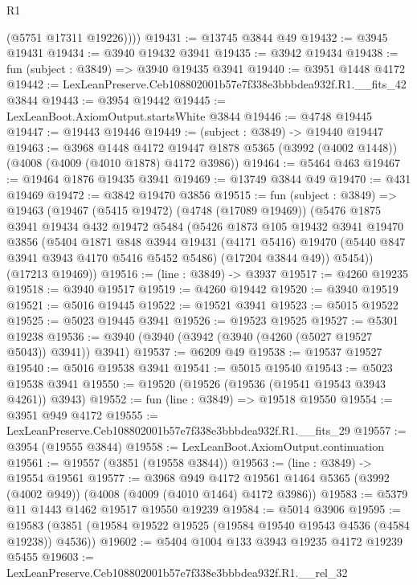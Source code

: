 \begin{lexlean}{R1}
\begin{coremodule}
          (@5751 @17311 @19226))))
@19431 := @13745 @3844 @49
@19432 := @3945 @19431
@19434 := @3940 @19432 @3941
@19435 := @3942 @19434
@19438 := fun (subject : @3849) => @3940 @19435 @3941
@19440 := @3951 @1448 @4172
@19442 := LexLeanPreserve.Ceb108802001b57e7f338e3bbbdea932f.R1.__fits_42 @3844
@19443 := @3954 @19442
@19445 := LexLeanBoot.AxiomOutput.startsWhite @3844
@19446 := @4748 @19445
@19447 := @19443 @19446
@19449 := (subject : @3849) -> @19440 @19447
@19463 := @3968
    @1448
    @4172
    @19447
    @1878
    @5365
    (@3992 (@4002 @1448))
    (@4008 (@4009 (@4010 @1878) @4172 @3986))
@19464 := @5464 @463
@19467 := @19464 @1876 @19435 @3941
@19469 := @13749 @3844 @49
@19470 := @431 @19469
@19472 := @3842 @19470 @3856
@19515 := fun (subject : @3849) =>
  @19463
    (@19467
      (@5415 @19472)
      (@4748 (@17089 @19469))
      (@5476
        @1875
        @3941
        @19434
        @432
        @19472
        @5484
        (@5426
          @1873
          @105
          @19432
          @3941
          @19470
          @3856
          (@5404
            @1871
            @848
            @3944
            @19431
            (@4171 @5416)
            @19470
            (@5440 @847 @3941 @3943 @4170 @5416 @5452 @5486)
            (@17204 @3844 @49))
          @5454))
      (@17213 @19469))
@19516 := (line : @3849) -> @3937
@19517 := @4260 @19235
@19518 := @3940 @19517
@19519 := @4260 @19442
@19520 := @3940 @19519
@19521 := @5016 @19445
@19522 := @19521 @3941
@19523 := @5015 @19522
@19525 := @5023 @19445 @3941
@19526 := @19523 @19525
@19527 := @5301 @19238
@19536 := @3940 (@3940 (@3942 (@3940 (@4260 (@5027 @19527 @5043)) @3941)) @3941)
@19537 := @6209 @49
@19538 := @19537 @19527
@19540 := @5016 @19538 @3941
@19541 := @5015 @19540
@19543 := @5023 @19538 @3941
@19550 := @19520 (@19526 (@19536 (@19541 @19543 @3943 @4261)) @3943)
@19552 := fun (line : @3849) => @19518 @19550
@19554 := @3951 @949 @4172
@19555 := LexLeanPreserve.Ceb108802001b57e7f338e3bbbdea932f.R1.__fits_29
@19557 := @3954 (@19555 @3844)
@19558 := LexLeanBoot.AxiomOutput.continuation
@19561 := @19557 (@3851 (@19558 @3844))
@19563 := (line : @3849) -> @19554 @19561
@19577 := @3968
    @949
    @4172
    @19561
    @1464
    @5365
    (@3992 (@4002 @949))
    (@4008 (@4009 (@4010 @1464) @4172 @3986))
@19583 := @5379 @11 @1443 @1462 @19517 @19550 @19239
@19584 := @5014 @3906
@19595 := @19583 (@3851 (@19584 @19522 @19525 (@19584 @19540 @19543 @4536 (@4584 @19238)) @4536))
@19602 := @5404 @1004 @133 @3943 @19235 @4172 @19239 @5455
@19603 := LexLeanPreserve.Ceb108802001b57e7f338e3bbbdea932f.R1.__rel_32

\end{coremodule}
\end{lexlean}
